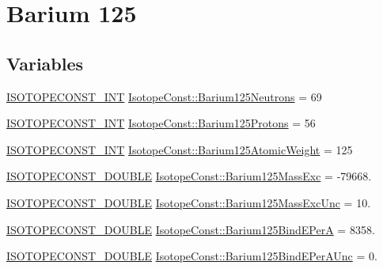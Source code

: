 \hypertarget{group___isotope_const-_barium-_ba125}{}\section{Barium 125}
\label{group___isotope_const-_barium-_ba125}
\subsection*{Variables}
\begin{DoxyCompactItemize}
\item 
\mbox{\hyperlink{group___isotope_const-_macros_ga5f18360b3e99483a35c32d789e62621c}{I\+S\+O\+T\+O\+P\+E\+C\+O\+N\+S\+T\+\_\+\+I\+NT}} \mbox{\hyperlink{group___isotope_const-_barium-_ba125_gade3b648c8cc0f7760cdc93e3ed49bbc9}{Isotope\+Const\+::\+Barium125\+Neutrons}} = 69
\item 
\mbox{\hyperlink{group___isotope_const-_macros_ga5f18360b3e99483a35c32d789e62621c}{I\+S\+O\+T\+O\+P\+E\+C\+O\+N\+S\+T\+\_\+\+I\+NT}} \mbox{\hyperlink{group___isotope_const-_barium-_ba125_gadd13e4102318766a0a1a9f78a5f01945}{Isotope\+Const\+::\+Barium125\+Protons}} = 56
\item 
\mbox{\hyperlink{group___isotope_const-_macros_ga5f18360b3e99483a35c32d789e62621c}{I\+S\+O\+T\+O\+P\+E\+C\+O\+N\+S\+T\+\_\+\+I\+NT}} \mbox{\hyperlink{group___isotope_const-_barium-_ba125_ga6c5d5e0f445148dd9a9c7720f50d980c}{Isotope\+Const\+::\+Barium125\+Atomic\+Weight}} = 125
\item 
\mbox{\hyperlink{group___isotope_const-_macros_ga8f45a7272ce02c0b4c65c44636ed719a}{I\+S\+O\+T\+O\+P\+E\+C\+O\+N\+S\+T\+\_\+\+D\+O\+U\+B\+LE}} \mbox{\hyperlink{group___isotope_const-_barium-_ba125_gab9ddf91b834cd328577fff5efc8731c1}{Isotope\+Const\+::\+Barium125\+Mass\+Exc}} = -\/79668.
\item 
\mbox{\hyperlink{group___isotope_const-_macros_ga8f45a7272ce02c0b4c65c44636ed719a}{I\+S\+O\+T\+O\+P\+E\+C\+O\+N\+S\+T\+\_\+\+D\+O\+U\+B\+LE}} \mbox{\hyperlink{group___isotope_const-_barium-_ba125_gaff1042d1f24ca08ed5aa21545c00cb32}{Isotope\+Const\+::\+Barium125\+Mass\+Exc\+Unc}} = 10.
\item 
\mbox{\hyperlink{group___isotope_const-_macros_ga8f45a7272ce02c0b4c65c44636ed719a}{I\+S\+O\+T\+O\+P\+E\+C\+O\+N\+S\+T\+\_\+\+D\+O\+U\+B\+LE}} \mbox{\hyperlink{group___isotope_const-_barium-_ba125_ga173a943aad97eaacf3e74d3d78cb22f2}{Isotope\+Const\+::\+Barium125\+Bind\+E\+PerA}} = 8358.
\item 
\mbox{\hyperlink{group___isotope_const-_macros_ga8f45a7272ce02c0b4c65c44636ed719a}{I\+S\+O\+T\+O\+P\+E\+C\+O\+N\+S\+T\+\_\+\+D\+O\+U\+B\+LE}} \mbox{\hyperlink{group___isotope_const-_barium-_ba125_gae1707c58dbe95f890a096333b67260e3}{Isotope\+Const\+::\+Barium125\+Bind\+E\+Per\+A\+Unc}} = 0.

\end{DoxyCompactItemize}

